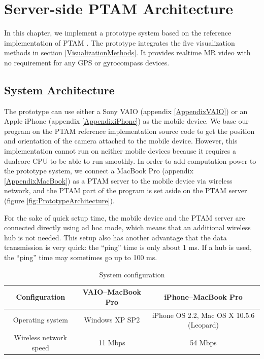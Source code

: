\chapter{Server-side PTAM Architecture}
\label{Chapter3}

In this chapter, we implement a prototype system based on the reference implementation of PTAM \cite{Reference12}. The prototype integrates the five visualization methods in section \ref{VisualizationMethods}. It provides realtime MR video with no requirement for any GPS or gyrocompass devices.


\section{System Architecture}

The prototype can use either a Sony VAIO (appendix \ref{AppendixVAIO}) or an Apple iPhone (appendix \ref{AppendixiPhone}) as the mobile device. We base our program on the PTAM reference implementation source code \cite{Reference16} to get the position and orientation of the camera attached to the mobile device. However, this implementation cannot run on neither mobile devices because it requires a dualcore CPU to be able to run smoothly. In order to add computation power to the prototype system, we connect a MacBook Pro (appendix \ref{AppendixMacBook}) as a PTAM server to the mobile device via wireless network, and the PTAM part of the program is set aside on the PTAM server (figure \ref{fig:PrototypeArchitecture}).

For the sake of quick setup time, the mobile device and the PTAM server are connected directly using ad hoc mode, which means that an additional wireless hub is not needed. This setup also has another advantage that the data transmission is very quick: the ``ping'' time is only about 1 ms. If a hub is used, the ``ping'' time may sometimes go up to 100 ms.

\begin{table}[tb]
	\begin{center}
		\caption{System configuration}
		\label{tb:SystemConfiguration}
		\begin{tabular}{|c|c|c|}
			\hline
			Configuration          & VAIO--MacBook Pro & iPhone--MacBook Pro                      \\
			\hline
			Operating system       & Windows XP SP2    & iPhone OS 2.2, Mac OS X 10.5.6 (Leopard) \\
			Wireless network speed & 11 Mbps           & 54 Mbps                                  \\
			\hline
		\end{tabular}
	\end{center}
\end{table}


